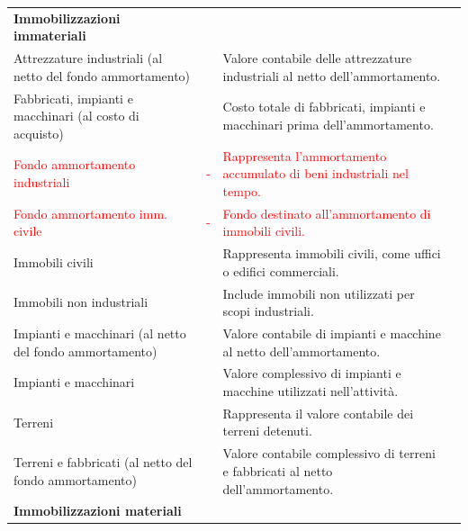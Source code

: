 \documentclass{article}
\newcommand{\AttrezzatureIndustrialiNetto}{Valore contabile delle attrezzature industriali al netto dell'ammortamento.}
\newcommand{\FabbricatiImpiantiMacchinari}{Costo totale di fabbricati, impianti e macchinari prima dell'ammortamento.}
\newcommand{\FondoAmmortamentoIndustriali}{Rappresenta l'ammortamento accumulato di beni industriali nel tempo.}
\newcommand{\FondoAmmortamentoImmobiliCivili}{Fondo destinato all'ammortamento di immobili civili.}
\newcommand{\ImmobiliCivili}{Rappresenta immobili civili, come uffici o edifici commerciali.}
\newcommand{\ImmobiliNonIndustriali}{Include immobili non utilizzati per scopi industriali.}
\newcommand{\ImpiantiMacchinariNetto}{Valore contabile di impianti e macchine al netto dell'ammortamento.}
\newcommand{\ValoreComplessivoImpiantiMacchine}{Valore complessivo di impianti e macchine utilizzati nell'attività.}
\newcommand{\ValoreContabileTerreni}{Rappresenta il valore contabile dei terreni detenuti.}
\newcommand{\ValoreComplessivoTerreniFabbricatiNetto}{Valore contabile complessivo di terreni e fabbricati al netto dell'ammortamento.}
\begin{document}
\begin{table}[ht]
{\begin{tabular}{|l|c|l|c|}
            \textbf{Immobilizzazioni immateriali}                                           &                    &                                                   &                 \\
            Attrezzature industriali (al netto del fondo ammortamento)                      &                    & \AttrezzatureIndustrialiNetto                     &                 \\
            Fabbricati, impianti e macchinari (al costo di acquisto)                        &                    & \FabbricatiImpiantiMacchinari                     &                 \\
            \textcolor{red}{Fondo ammortamento industriali}                                 & \textcolor{red}{-} & \textcolor{red}{\FondoAmmortamentoIndustriali}    &                 \\
            \textcolor{red}{Fondo ammortamento imm. civile}                                 & \textcolor{red}{-} & \textcolor{red}{\FondoAmmortamentoImmobiliCivili} &                 \\
            Immobili civili                                                                 &                    & \ImmobiliCivili                                   &                 \\
            Immobili non industriali                                                        &                    & \ImmobiliNonIndustriali                           &                 \\
            Impianti e macchinari (al netto del fondo ammortamento)                         &                    & \ImpiantiMacchinariNetto                          &                 \\
            Impianti e macchinari                                                           &                    & \ValoreComplessivoImpiantiMacchine                &                 \\
            Terreni                                                                         &                    & \ValoreContabileTerreni                           &                 \\
            Terreni e fabbricati (al netto del fondo ammortamento)                          &                    & \ValoreComplessivoTerreniFabbricatiNetto          &                 \\
            \textbf{Immobilizzazioni materiali }                                            &                    &                                                   &                 \\

\end{tabular}}
\end{table}
\end{document}
